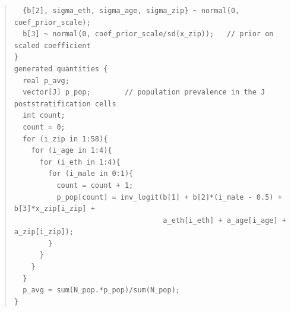 \documentclass[11pt]{article}
\begin{document}
\begin{small}
\begin{quotation}
\begin{verbatim}
  {b[2], sigma_eth, sigma_age, sigma_zip} ~ normal(0, coef_prior_scale);
  b[3] ~ normal(0, coef_prior_scale/sd(x_zip));   // prior on scaled coefficient
}
generated quantities {
  real p_avg;
  vector[J] p_pop;        // population prevalence in the J poststratification cells
  int count;
  count = 0;
  for (i_zip in 1:58){
    for (i_age in 1:4){
      for (i_eth in 1:4){
        for (i_male in 0:1){
          count = count + 1;
          p_pop[count] = inv_logit(b[1] + b[2]*(i_male - 0.5) + b[3]*x_zip[i_zip] +
                                   a_eth[i_eth] + a_age[i_age] + a_zip[i_zip]);      
        }
      }
    }
  }
  p_avg = sum(N_pop.*p_pop)/sum(N_pop);
}
\end{verbatim}
\end{quotation}
\end{small}
\end{document}
